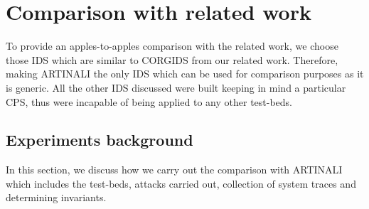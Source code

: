 
\chapter{Comparison with related work}
\label{ch:comparisonwithrelatedwork}

To provide an apples-to-apples comparison with the related work, we choose those IDS which are similar to CORGIDS from our related work. Therefore, making ARTINALI the only IDS which can be used for comparison purposes as it is generic. All the other IDS discussed were built keeping in mind a particular CPS, thus were incapable of being applied to any other test-beds.

\section{Experiments background}
In this section, we discuss how we carry out the comparison with ARTINALI which includes the test-beds, attacks carried out, collection of system traces and determining invariants. 
